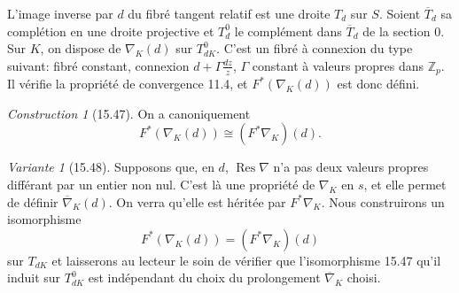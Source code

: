\documentclass[12pt,a4paper]{article}
\theoremstyle{plain}
\theoremstyle{definition}
\theoremstyle{remark}
\newtheorem{construction}[theorem]{Construction}
\newtheorem{variante}[theorem]{Variante}
\DeclareMathOperator{\Res}{Res}
\newcommand{\bZ}{\mathbb{Z}}
\begin{document}
L'image inverse par $d$ du fibré tangent relatif est une droite $T_d$ sur $S$. Soient $\overline{T}_d$ sa complétion en une droite projective et $T_d^0$ le complément dans $\overline{T}_d$ de la section $0$. Sur $K$, on dispose de $\nabla_K(d)$ sur $T_{dK}^0$. C'est un fibré à connexion du type suivant: fibré constant, connexion $d + \Gamma \frac{dz}{z}$, $\Gamma$ constant à valeurs propres dans $\bZ_p$. Il vérifie la propriété de convergence 11.4, et $F^*(\nabla_K(d))$ est donc défini.

\begin{construction}[15.47]
On a canoniquement
\[
F^*(\nabla_K(d)) \cong (F^* \nabla_K)(d).
\]
\end{construction}

\begin{variante}[15.48]
Supposons que, en $d$, $\Res \nabla$ n'a pas deux valeurs propres différant par un entier non nul. C'est là une propriété de $\nabla_K$ en $s$, et elle permet de définir $\overline{\nabla}_K(d)$. On verra qu'elle est héritée par $F^* \nabla_K$. Nous construirons un isomorphisme
\begin{equation}\label{eq:15.48.1}
F^*(\nabla_K(d)) = (F^* \nabla_K)(d)
\end{equation}
sur $T_{dK}$ et laisserons au lecteur le soin de vérifier que l'isomorphisme 15.47 qu'il induit sur $T_{dK}^0$ est indépendant du choix du prolongement $\overline{\nabla}_K$ choisi.
\end{variante}
\end{document}
